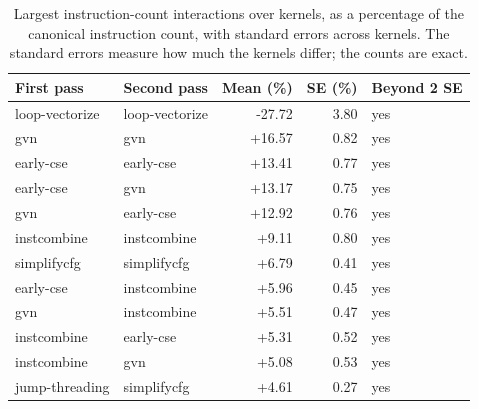 \begin{table}[t]
\centering
\caption{Largest instruction-count interactions over kernels, as a percentage of the canonical instruction count, with standard errors across kernels. The standard errors measure how much the kernels differ; the counts are exact.}
\label{tab:instcount}
\setlength{\tabcolsep}{3pt}
\begin{tabular}{|l|l|r|r|l|}
\hline
First pass & Second pass & Mean (\%) & SE (\%) & Beyond 2 SE \\
\hline
loop-vectorize & loop-vectorize & -27.72 & 3.80 & yes \\
\hline
gvn & gvn & +16.57 & 0.82 & yes \\
\hline
early-cse & early-cse & +13.41 & 0.77 & yes \\
\hline
early-cse & gvn & +13.17 & 0.75 & yes \\
\hline
gvn & early-cse & +12.92 & 0.76 & yes \\
\hline
instcombine & instcombine & +9.11 & 0.80 & yes \\
\hline
simplifycfg & simplifycfg & +6.79 & 0.41 & yes \\
\hline
early-cse & instcombine & +5.96 & 0.45 & yes \\
\hline
gvn & instcombine & +5.51 & 0.47 & yes \\
\hline
instcombine & early-cse & +5.31 & 0.52 & yes \\
\hline
instcombine & gvn & +5.08 & 0.53 & yes \\
\hline
jump-threading & simplifycfg & +4.61 & 0.27 & yes \\
\hline
\end{tabular}
\end{table}
